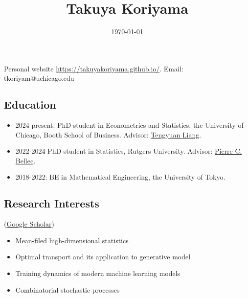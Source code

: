 \documentclass[10pt]{amsart}
\date{\today}
\title{Takuya Koriyama}
\begin{document}
\maketitle
\begin{center}
  Personal website \url{https://takuyakoriyama.github.io/}.
Email: tkoriyam@uchicago.edu
\end{center}
\subsection*{Education}
\begin{itemize}
  \item 2024-present: PhD student in Econometrics and Statistics, the University of Chicago, Booth School of Business. Advisor: \href{https://tyliang.github.io}{Tengyuan Liang}. 
  \item 2022-2024 PhD student in Statistics, Rutgers University. Advisor: \href{https://statweb.rutgers.edu/PCB71/}{Pierre C. Bellec}. 
  \item 2018-2022: BE in Mathematical Engineering, the University of Tokyo. 
\end{itemize}

\subsection*{Research Interests} (\href{https://scholar.google.com/citations?user=JOqLea0AAAAJ&hl=en&oi=ao}{Google Scholar})
\noindent
\begin{itemize}
\item Mean-filed high-dimensional statistics
\item  Optimal transport and its application to generative model
\item  Training dynamics of modern machine learning models 
\item  Combinatorial stochastic processes
\end{itemize}
\end{document}
